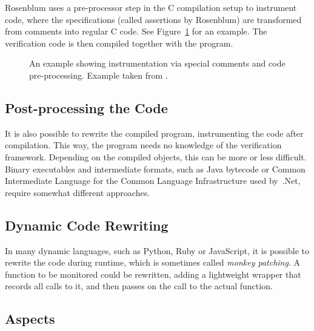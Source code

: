 \documentclass[a4paper,11pt]{kth-mag}
\begin{document}
Rosenblum \cite{rosenblum95practicalassertions} uses a pre-processor step in
the C compilation setup to instrument code, where the specifications (called
assertions by Rosenblum) are transformed from comments into regular C code. See
Figure~\ref{figure-pre-processing-comments-example} for an example. The
verification code is then compiled together with the program.

\begin{figure}[h!]
	\begin{center}
	\begin{minipage}{0.7\textwidth}
    \lstset{language=C}
		
	\end{minipage}
	\end{center}
  \caption{An example showing instrumentation via special comments and code
    pre-processing. Example taken from \cite{rosenblum95practicalassertions}.}
	\label{figure-pre-processing-comments-example}
\end{figure}

\subsection{Post-processing the Code}

It is also possible to rewrite the compiled program, instrumenting the code
after compilation. This way, the program needs no knowledge of the verification
framework. Depending on the compiled objects, this can be more or less
difficult. Binary executables and intermediate formats, such as Java bytecode
or Common Intermediate Language for the Common Language Infrastructure used
by~.Net, require somewhat different approaches.


\subsection{Dynamic Code Rewriting}

In many dynamic languages, such as Python, Ruby or JavaScript, it is possible
to rewrite the code during runtime, which is sometimes called \textit{monkey
patching}. A function to be monitored could be rewritten, adding a lightweight
wrapper that records all calls to it, and then passes on the call to the actual
function.


\subsection{Aspects} \label{section-aspects}
\end{document}
